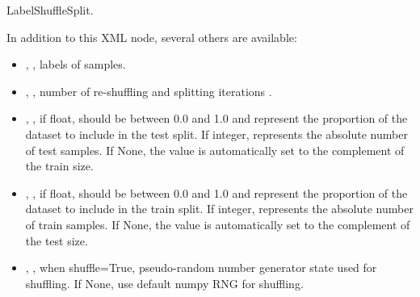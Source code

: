 LabelShuffleSplit.

In addition to this XML node, several others are available:
\begin{itemize}
  \item {}, , labels of samples.
  \item {}, , number of re-shuffling and splitting iterations
    .
  \item {}, , if float, should be between 0.0 and 1.0 and
    represent the proportion of the dataset to include in the test split. 
    If integer, represents the absolute number of test samples. If None, the value is automatically set to
    the complement of the train size.
  \item {}, , if float, should be between 0.0 and 1.0 and represent
    the proportion of the dataset to include in the train split. If integer, represents the absolute number of train
    samples. If None, the value is automatically set to the complement of the test size. 
  \item {}, , when shuffle=True,
    pseudo-random number generator state used for shuffling. If None, use default numpy RNG for shuffling.
\end{itemize}



